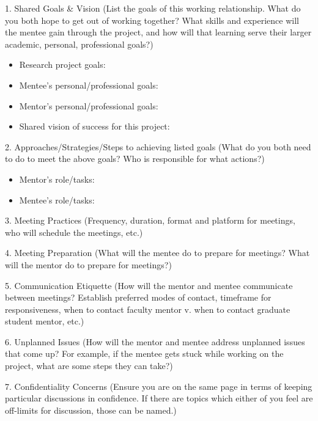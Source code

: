 \documentclass[fleqn,10pt]{wlscirep}
\begin{document}
1. Shared Goals \& Vision (List the goals of this working relationship. What do you both hope to get out of working together? What skills and experience will the mentee gain through the project, and how will that learning serve their larger academic, personal, professional goals?)

\begin{itemize}	
\item Research project goals:
\item Mentee’s personal/professional goals:
\item Mentor’s personal/professional goals: 
\item Shared vision of success for this project: 
\end{itemize}

2.	Approaches/Strategies/Steps to achieving listed goals (What do you both need to do to meet the above goals? Who is responsible for what actions?)
 
\begin{itemize}
\item Mentor’s role/tasks:
\item Mentee’s role/tasks:
\end{itemize}
 

3.	Meeting Practices (Frequency, duration, format and platform for meetings, who will schedule the meetings, etc.)



4.	Meeting Preparation (What will the mentee do to prepare for meetings? What will the mentor do to prepare for meetings?)
 
 
 
5.	Communication Etiquette (How will the mentor and mentee communicate between meetings? Establish preferred modes of contact, timeframe for responsiveness, when to contact faculty mentor v. when to contact graduate student mentor, etc.)



6.	Unplanned Issues (How will the mentor and mentee address unplanned issues that come up? For example, if the mentee gets stuck while working on the project, what are some steps they can take?)



7.	Confidentiality Concerns (Ensure you are on the same page in terms of keeping particular discussions in confidence. If there are topics which either of you feel are off-limits for discussion, those can be named.)
 
\end{document}
